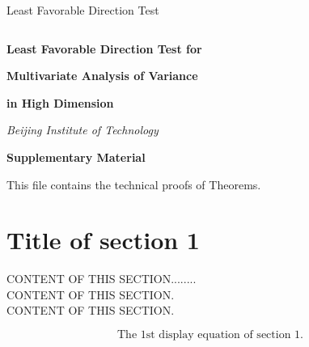 \documentclass[10pt]{book}
\theoremstyle{definition}
\begin{document}
\renewcommand{\baselinestretch}{2}


{\hfill {\footnotesize\rm Least Favorable Direction Test} \hfill}

\renewcommand{\thefootnote}{}
$\ $\par \fontsize{12}{14pt plus.8pt minus .6pt}\selectfont


 \centerline{\large\bf Least Favorable Direction Test for }
\vspace{2pt}
 \centerline{\large\bf Multivariate Analysis of Variance}
\vspace{2pt}
 \centerline{\large\bf in High Dimension}
\vspace{.25cm}
 \author{Rui Wang, Xingzhong Xu}
\vspace{.4cm}
 \centerline{\it Beijing Institute of Technology}
\vspace{.55cm}
 \centerline{\bf Supplementary Material}
\vspace{.55cm}
\fontsize{9}{11.5pt plus.8pt minus .6pt}\selectfont
\noindent
This file contains the technical proofs of Theorems.
\par

\setcounter{section}{0}
\setcounter{equation}{0}
\def\theequation{S\arabic{section}.\arabic{equation}}
\def\thesection{S\arabic{section}}

\fontsize{12}{14pt plus.8pt minus .6pt}\selectfont

\section{Title of section 1}

CONTENT OF THIS SECTION........\\
CONTENT OF THIS SECTION.\\
CONTENT OF THIS SECTION.\\
\par
\begin{equation}
\mbox {The 1st display equation of section 1.}
\end{equation}
\end{document}

